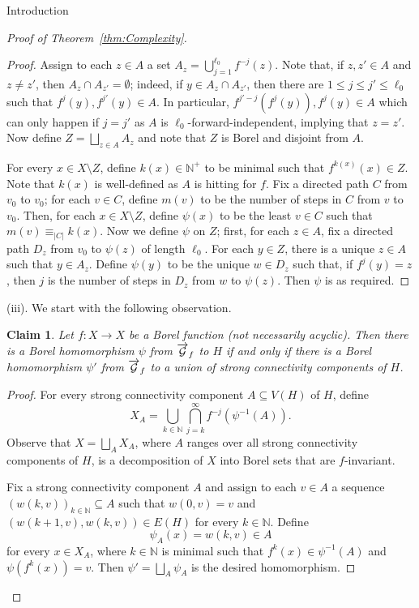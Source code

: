 \documentclass[psamsfonts]{amsart}
\newtheorem{claim}[thm]{Claim}
\theoremstyle{definition}
\newcommand{\N}{\mathbb N}
\theoremstyle{remark}
\numberwithin{equation}{section}
\begin{document}
\begin{section}{Introduction}
\begin{proof}[Proof of Theorem~\ref{thm:Complexity}]
\begin{proof}
        Assign to each $z\in A$ a set $A_z=\bigcup_{j=1}^{\ell_0} f^{-j}(z)$.
        Note that, if $z, z' \in A$ and $z \neq z'$, then $A_z \cap A_{z'} = \emptyset$; indeed, if $y\in A_z\cap A_{z'}$, then there are $1\le j\le j'\le \ell_0$ such that $f^j(y),f^{j'}(y)\in A$.
        In particular, $f^{j'-j}(f^j(y)),f^j(y)\in A$ which can only happen if $j=j'$ as $A$ is $\ell_0$-forward-independent, implying that $z=z'$. Now define $Z = \bigsqcup_{z \in A} A_z$ and note that $Z$ is Borel and disjoint from $A$.
        
        For every $x\in X\setminus Z$, define $k(x)\in \N^+$ to be minimal such that $f^{k(x)}(x)\in Z$.
        Note that $k(x)$ is well-defined as $A$ is hitting for $f$.
        Fix a directed path $C$ from $v_0$ to $v_0$; for each $v \in C$, define $m(v)$ to be the number of steps in $C$ from $v$ to $v_0$.
        Then, for each $x \in X \setminus Z$, define $\psi(x)$ to be the least $v \in C$ such that $m(v)\equiv_{|C|} k(x)$.
        Now we define $\psi$ on $Z$; first, for each $z\in A$, fix a directed path $D_z$ from $v_0$ to $\psi(z)$ of length $\ell_0$.
        For each $y \in Z$, there is a unique $z \in A$ such that $y \in A_z$. Define $\psi(y)$ to be the unique $w \in D_z$ such that, if $f^j(y)=z$, then $j$ is the number of steps in $D_z$ from $w$ to $\psi(z)$.
        Then $\psi$ is as required.
    \end{proof}

    (iii).
    We start with the following observation.

    \begin{claim}\label{cl:Observe}
        Let $f:X\to X$ be a Borel function (not necessarily acyclic).
        Then there is a Borel homomorphism $\psi$ from $\overrightarrow{\mathcal{G}}_f$ to $H$ if and only if there is a Borel homomorphism $\psi'$ from $\overrightarrow{\mathcal{G}}_f$ to a union of strong connectivity components of $H$.
    \end{claim}
    \begin{proof}
    For every strong connectivity component $A\subseteq V(H)$ of $H$, define
    $$X_A=\bigcup_{k\in \N} \bigcap_{j=k}^\infty f^{-j}(\psi^{-1}(A)).$$
    Observe that $X=\bigsqcup_A X_A$, where $A$ ranges over all strong connectivity components of $H$, is a decomposition of $X$ into  Borel sets that are $f$-invariant.

    Fix a strong connectivity component $A$ and assign to each $v\in A$ a sequence $(w(k,v))_{k\in \N}\subseteq A$ such that $w(0,v)=v$ and $(w(k+1,v),w(k,v))\in E(H)$ for every $k\in \N$.    
    Define 
    $$\psi_A(x)=w(k,v)\in A$$
    for every $x\in X_A$, where $k\in \N$ is minimal such that $f^k(x)\in \psi^{-1}(A)$ and $\psi(f^k(x))=v$.
    Then $\psi'=\bigsqcup_A \psi_A$ is the desired homomorphism.    
    \end{proof}
    

\end{proof}
\end{section}
\end{document}
